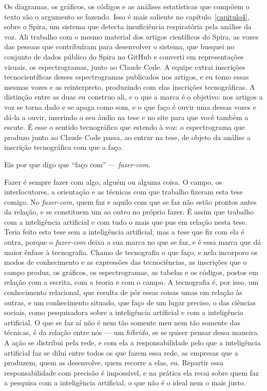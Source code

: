 Os diagramas, os gráficos, os códigos e as análises estatísticas que compõem o texto são o argumento se fazendo. Isso é mais saliente no capítulo~\ref{capitulo4}, sobre o Spira, um sistema que detecta insuficiência respiratória pela análise da voz. Ali trabalho com o mesmo material dos artigos científicos do Spira, as vozes das pessoas que contribuíram para desenvolver o sistema, que busquei no conjunto de dados público do Spira no GitHub e converti em representações visuais, os espectrogramas, junto ao Claude Code. A equipe extrai inscrições tecnocientíficas desses espectrogramas publicados nos artigos, e eu tomo essas mesmas vozes e as reinterpreto, produzindo com elas inscrições tecnográficas. A distinção entre as duas eu construo ali, e o que a marca é o objetivo: nos artigos a voz se torna dado e se apaga como som, e o que faço é ouvir uma dessas vozes e dá-la a ouvir, inserindo o seu áudio na tese e no site para que você também a escute. É esse o sentido tecnográfico que estendo à voz: o espectrograma que produzo junto ao Claude Code passa, ao entrar na tese, de objeto da análise a inscrição tecnográfica com que a faço.

Eis por que digo que \enquote{faço com} --- \textit{fazer-com}.

Fazer é sempre fazer com algo, alguém ou alguma coisa. O campo, os interlocutores, a orientação e as técnicas com que trabalho fizeram esta tese comigo. No \textit{fazer-com}, quem faz e aquilo com que se faz não estão prontos antes da relação, e se constituem um ao outro no próprio fazer. É assim que trabalho com a inteligência artificial e com tudo o mais que pus em relação nesta tese. Teria feito esta tese sem a inteligência artificial, mas a tese que fiz com ela é outra, porque o \textit{fazer-com} deixa a sua marca no que se faz, e é essa marca que dá maior ênfase à tecnografia. Chamo de tecnografia o que faço, e nela incorporo os modos de conhecimento e as expressões das tecnociências, as inscrições que o campo produz, os gráficos, os espectrogramas, as tabelas e os códigos, postos em relação com a escrita, com a teoria e com o campo. A tecnografia é, por isso, um conhecimento relacional, que resulta de pôr essas coisas umas em relação às outras, e um conhecimento situado, que faço de um lugar preciso, o das ciências sociais, como pesquisadora sobre a inteligência artificial e com a inteligência artificial. O que se faz aí não é nem tão somente meu nem tão somente das técnicas, é da relação entre nós --- um \textit{híbrido}, se se quiser pensar dessa maneira. A ação se distribui pela rede, e com ela a responsabilidade pelo que a inteligência artificial faz se dilui entre todos os que fazem essa rede, as empresas que a produzem, quem as desenvolve, quem recorre a elas, eu. Repartir essa responsabilidade com precisão é impossível, e na prática ela recai sobre quem faz a pesquisa com a inteligência artificial, o que não é o ideal nem o mais justo. 


